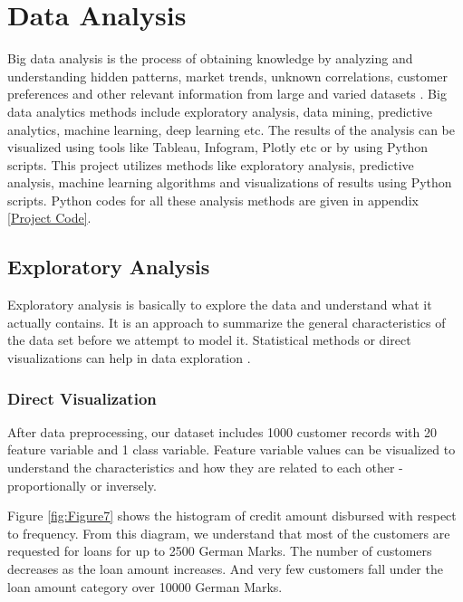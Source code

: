 \documentclass[sigconf]{acmart}
\begin{document}
\section{Data Analysis}

Big data analysis is the process of obtaining knowledge by analyzing and understanding hidden patterns, market trends, unknown correlations, customer preferences and other relevant information from large and varied datasets \cite{bigdata-analytics}. Big data analytics methods include exploratory analysis, data mining, predictive analytics, machine learning, deep learning etc. The results of the analysis can be visualized using tools like Tableau, Infogram, Plotly etc or by using Python scripts. This project utilizes methods like exploratory analysis, predictive analysis, machine learning algorithms and visualizations of results using Python scripts. Python codes for all these analysis methods are given in appendix \ref{Project Code}.

\subsection{Exploratory Analysis}

Exploratory analysis is basically to explore the data and understand what it actually contains. It is an approach to summarize the general characteristics of the data set before we attempt to model it. Statistical methods or direct visualizations can help in data exploration \cite{exploratory-analysis}. 

\subsubsection{Direct Visualization}

After data preprocessing, our dataset includes 1000 customer records with 20 feature variable and 1 class variable. Feature variable values can be visualized to understand the characteristics and how they are related to each other - proportionally or inversely. 

Figure \ref{fig:Figure7} shows the histogram of credit amount disbursed with respect to frequency. From this diagram, we understand that most of the customers are requested for loans for up to 2500 German Marks. The number of customers decreases as the loan amount increases. And very few customers fall under the loan amount category over 10000 German Marks. 
\end{document}
